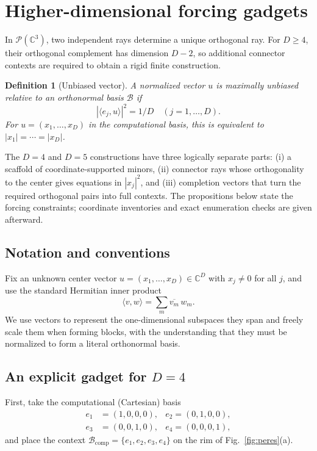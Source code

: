 \documentclass[%
  reprint,
  superscriptaddress,
  showpacs,
  showkeys,
  amsmath,amssymb,
  pra,
  longbibliography,
  floatfix,
  x11names
]{revtex4-2}
\newcommand{\rev}[1]{{\color{revisionblue}#1}}
\newenvironment{revision}{\begingroup\color{revisionblue}}{\endgroup}
\newtheorem{definition}{Definition}
\begin{document}




\section{Higher-dimensional forcing gadgets}
\label{2025-hdfg}

\begin{revision}
In $\mathcal{P}(\mathbb{C}^3)$, two independent rays determine a unique orthogonal ray.  For $D\geq4$, their orthogonal complement has dimension $D-2$, so additional connector contexts are required to obtain a rigid finite construction.

\begin{definition}[Unbiased vector]
\label{def:unbiased}
A normalized vector $u$ is maximally unbiased relative to an orthonormal basis $\mathcal{B}$ if
\[
|\langle e_j,u\rangle|^2=1/D\quad (j=1,\ldots,D).
\]
For $u=(x_1,\ldots,x_D)$ in the computational basis, this is equivalent to $|x_1|=\cdots=|x_D|$. 
\end{definition}

The $D=4$ and $D=5$ constructions have three logically separate parts: (i) a scaffold of coordinate-supported minors, (ii) connector rays whose orthogonality to the center gives equations in $|x_j|^2$, and (iii) completion vectors that turn the required orthogonal pairs into full contexts.  The propositions below state the forcing constraints; coordinate inventories and exact enumeration checks are given afterward.
\end{revision}

\subsection{Notation and conventions}
Fix an unknown center vector $u = (x_1,\dots,x_D) \in \mathbb{C}^D$ with $x_j \ne 0$ for all $j$, and use the standard Hermitian inner product
\[
\langle v,w\rangle = \sum_m \overline{v_m}\, w_m.
\]
We use vectors to represent the one-dimensional subspaces they span and freely scale them when forming blocks,
with the understanding that they must be normalized to form a literal orthonormal basis.

\subsection{An explicit gadget for $D=4$}

\rev{First, take the computational (Cartesian) basis}
\begin{align*}
e_1&=(1,0,0,0), &
e_2 =(0,1,0,0),\\
e_3&=(0,0,1,0), &
e_4 =(0,0,0,1),
\end{align*}
\rev{and place the context $\mathcal{B}_{\mathrm{comp}}=\{e_1,e_2,e_3,e_4\}$ on the rim of Fig.~\ref{fig:peres}(a).}
\end{document}
